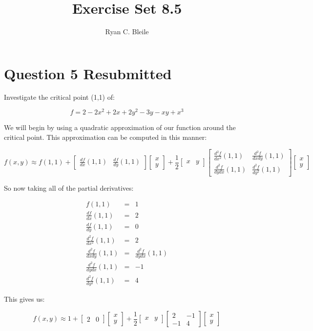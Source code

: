\documentclass[12pt]{article}
\title{Exercise Set 8.5}
\author{Ryan C. Bleile}
\begin{document}
\maketitle

\newpage

\section*{Question 5 Resubmitted}

Investigate the critical point (1,1) of:

\[ f = 2 - 2x^{2} + 2x + 2y^{2} - 3y - xy + x^{3} \]

We will begin by using a quadratic approximation of our function around the critical point. This approximation can be computed in this manner:

\[ f(x,y) \approx f(1,1) +
\begin{bmatrix}
\frac{df}{dx}(1,1) & \frac{df}{dy}(1,1)
\end{bmatrix}
\begin{bmatrix}
x\\
y
\end{bmatrix}
+
\frac{1}{2}
\begin{bmatrix}
x & y
\end{bmatrix}
\begin{bmatrix}
\frac{d^{2}f}{dx^{2}}(1,1) & \frac{d^{2}f}{dxdy}(1,1)\\
\frac{d^{2}f}{dydx}(1,1) & \frac{d^{2}f}{dy^{2}}(1,1)
\end{bmatrix}
\begin{bmatrix}
x\\
y
\end{bmatrix}
\]

So now taking all of the partial derivatives:

\begin{eqnarray}
f(1,1) &=& 1\\
\frac{df}{dx}(1,1)&=& 2\\
\frac{df}{dy}(1,1)&=& 0\\
\frac{d^{2}f}{dx^{2}}(1,1) &=& 2\\
\frac{d^{2}f}{dxdy}(1,1) &=& \frac{d^{2}f}{dydx}(1,1)\\
\frac{d^{2}f}{dydx}(1,1) &=& -1\\
\frac{d^{2}f}{dy^{2}}(1,1) &=& 4
\end{eqnarray}

This gives us:

\[
f(x,y) \approx 1 + 
\begin{bmatrix}
2 & 0
\end{bmatrix}
\begin{bmatrix}
x\\
y
\end{bmatrix}
+
\frac{1}{2}
\begin{bmatrix}
x & y
\end{bmatrix}
\begin{bmatrix}
2 & -1\\
-1 & 4
\end{bmatrix}
\begin{bmatrix}
x\\
y
\end{bmatrix}
\]
\end{document}
